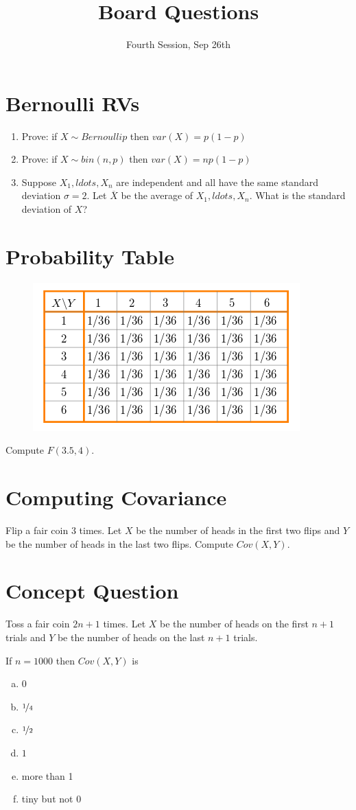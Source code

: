 \documentclass[11p,a4paper]{article}
\title{Board Questions}
\date{Fourth Session, Sep 26th}
\begin{document}
\maketitle

\section{Bernoulli RVs}
\begin{enumerate}
\item Prove: if $ X \sim Bernoulli p $ then $ var(X) = p(1-p) $
\item Prove: if $ X \sim bin(n,p) $ then $ var(X) = np(1-p) $
\item Suppose $ X_{1}, ldots, X_{n} $ are independent and all have the same 
standard deviation $ \sigma = 2 $. Let $ \overline{X} $ be the average of
$ X_{1}, ldots, X_{n} $. What is the standard deviation of $ X $?
\end{enumerate}

\section{Probability Table}
\begin{figure}[ht!]
\center
\includegraphics[scale=.6]{table.png} 
\end{figure}
Compute $ F(3.5,4) $.

\section{Computing Covariance}
Flip a fair coin 3 times. Let $ X $ be the number of heads in the first two flips and $ Y $ be
the number of heads in the last two flips. Compute $ Cov(X,Y) $.

\section{Concept Question}
Toss a fair coin $ 2n+1 $ times. Let $ X $ be the number of heads on the first $ n+1 $ trials and 
$ Y $ be the number of heads on the last $ n+1 $ trials.

If $ n=1000 $ then $ Cov(X,Y) $ is 
\begin{enumerate}[a)]
\item 0
\item $ \nicefrac{1}{4} $
\item $ \nicefrac{1}{2} $
\item $ 1 $
\item more than 1
\item tiny but not 0
\end{enumerate}
\end{document}
